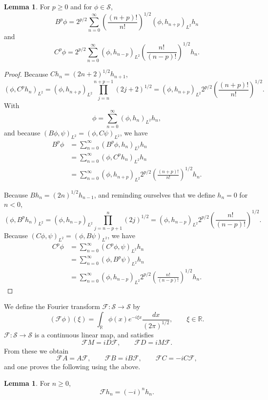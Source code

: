 \documentclass{article}
\theoremstyle{definition}
\newtheorem{lemma}[theorem]{Lemma}
\theoremstyle{definition}
\begin{document}
\begin{lemma}
For $p \geq 0$ and for $\phi \in \mathscr{S}$,
\[
B^p \phi = 2^{p/2}\sum_{n=0}^\infty \left( \frac{(n+p)!}{n!} \right)^{1/2} (\phi,h_{n+p})_{L^2}   h_n
\]
and
\[
C^p \phi =2^{p/2} \sum_{n=0}^\infty (\phi,h_{n-p})_{L^2}  \left( \frac{n!}{(n-p)!} \right)^{1/2} h_n.
\]
\end{lemma}
\begin{proof}
Because $Ch_n=(2n+2)^{1/2}h_{n+1}$,
\[
(\phi,C^p h_n)_{L^2}
=(\phi,h_{n+p})_{L^2} \prod_{j=n}^{n+p-1}(2j+2)^{1/2} 
=(\phi,h_{n+p})_{L^2} 2^{p/2}  \left( \frac{(n+p)!}{n!} \right)^{1/2}.
\]
With
\[
\phi = \sum_{n=0}^\infty (\phi,h_n)_{L^2} h_n,
\]
and because $(B\phi,\psi)_{L^2}=(\phi,C\psi)_{L^2}$, we have
\begin{align*}
B^p \phi &= \sum_{n=0}^\infty (B^p \phi,h_n)_{L^2} h_n\\
&=\sum_{n=0}^\infty  (\phi,C^p h_n)_{L^2} h_n\\
&=\sum_{n=0}^\infty (\phi,h_{n+p})_{L^2} 2^{p/2} \left( \frac{(n+p)!}{n!} \right)^{1/2} h_n.
\end{align*}

Because $Bh_n=(2n)^{1/2}h_{n-1}$, and reminding ourselves that we define $h_n=0$ for $n<0$,
\[
(\phi,B^ph_n)_{L^2}=(\phi,h_{n-p})_{L^2} \prod_{j=n-p+1}^n (2j)^{1/2}
=(\phi,h_{n-p})_{L^2} 2^{p/2} \left( \frac{n!}{(n-p)!} \right)^{1/2}.
\]
Because $(C\phi,\psi)_{L^2}=(\phi,B\psi)_{L^2}$, we have
\begin{align*}
C^p\phi&=\sum_{n=0}^\infty (C^p\phi,\psi)_{L^2} h_n\\
&=\sum_{n=0}^\infty (\phi,B^p\psi)_{L^2} h_n\\
&=\sum_{n=0}^\infty (\phi,h_{n-p})_{L^2} 2^{p/2} \left( \frac{n!}{(n-p)!} \right)^{1/2} h_n.
\end{align*}
\end{proof}

We define the Fourier transform $\mathscr{F}:\mathscr{S} \to \mathscr{S}$ by
\[
(\mathscr{F}\phi)(\xi) = \int_{\mathbb{R}} \phi(x) e^{-i\xi x} \frac{dx}{(2\pi)^{1/2}},\qquad \xi \in \mathbb{R}.
\]
$\mathscr{F}:\mathscr{S} \to \mathscr{S}$ is a continuous linear map, and satisfies
\[
\mathscr{F}M = iD\mathscr{F},\qquad \mathscr{F}D = iM\mathscr{F}. 
\]
From these we obtain
\[
\mathscr{F}A=A\mathscr{F},\qquad \mathscr{F}B=iB\mathscr{F},\qquad \mathscr{F}C=-iC\mathscr{F},
\]
and one proves the following using the above.

\begin{lemma}
For $n \geq 0$,
\[
\mathscr{F}h_n = (-i)^n h_n.
\] 
\end{lemma}
\end{document}
